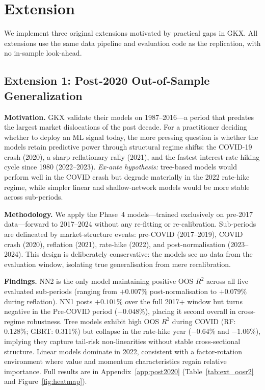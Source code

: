 \documentclass[11pt,a4paper]{article}
\begin{document}
\section{Extension}

We implement three original extensions motivated by practical gaps in GKX. All extensions use the same data pipeline and evaluation code as the replication, with no in-sample look-ahead.

\subsection{Extension 1: Post-2020 Out-of-Sample Generalization}

\textbf{Motivation.} GKX validate their models on 1987--2016---a period that predates the largest market dislocations of the past decade. For a practitioner deciding whether to deploy an ML signal today, the more pressing question is whether the models retain predictive power through structural regime shifts: the COVID-19 crash (2020), a sharp reflationary rally (2021), and the fastest interest-rate hiking cycle since 1980 (2022--2023). \textit{Ex-ante hypothesis:} tree-based models would perform well in the COVID crash but degrade materially in the 2022 rate-hike regime, while simpler linear and shallow-network models would be more stable across sub-periods.

\vspace{4pt}
\textbf{Methodology.} We apply the Phase~4 models---trained exclusively on pre-2017 data---forward to 2017--2024 without any re-fitting or re-calibration. Sub-periods are delineated by market-structure events: pre-COVID (2017--2019), COVID crash (2020), reflation (2021), rate-hike (2022), and post-normalisation (2023--2024). This design is deliberately conservative: the models see no data from the evaluation window, isolating true generalisation from mere recalibration.

\vspace{4pt}
\textbf{Findings.} NN2 is the only model maintaining positive OOS $R^2$ across all five evaluated sub-periods (ranging from $+0.007\%$ post-normalisation to $+0.079\%$ during reflation). NN1 posts $+0.101\%$ over the full 2017+ window but turns negative in the Pre-COVID period ($-0.048\%$), placing it second overall in cross-regime robustness. Tree models exhibit high OOS $R^2$ during COVID (RF: 0.128\%; GBRT: 0.311\%) but collapse in the rate-hike year ($-0.64\%$ and $-1.06\%$), implying they capture tail-risk non-linearities without stable cross-sectional structure. Linear models dominate in 2022, consistent with a factor-rotation environment where value and momentum characteristics regain relative importance. Full results are in Appendix~\ref{app:post2020} (Table~\ref{tab:ext_oosr2} and Figure~\ref{fig:heatmap}).
\end{document}
